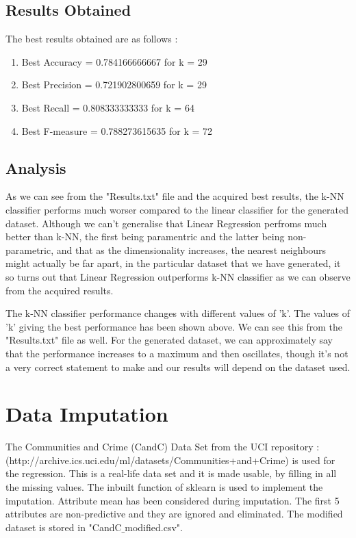 \documentclass[paper=a4, fontsize=11pt]{scrartcl}
\numberwithin{equation}{section}		%
\numberwithin{figure}{section}			%
\numberwithin{table}{section}				%
\begin{document}
\subsection{Results Obtained}
The best results obtained are as follows :
\begin{enumerate}
	\item Best Accuracy = 0.784166666667 for k = 29
	\item Best Precision = 0.721902800659 for k = 29
	\item Best Recall = 0.808333333333 for k = 64
	\item Best F-measure = 0.788273615635 for k = 72
\end{enumerate}

\subsection{Analysis}
As we can see from the "Results.txt" file and the acquired best results, the k-NN classifier performs much worser compared to the linear classifier for the generated dataset. Although we can't generalise that Linear Regression perfroms much better than k-NN, the first being paramentric and the latter being non-parametric, and that as the dimensionality increases, the nearest neighbours might actually be far apart, in the particular dataset that we have generated, it so turns out that Linear Regression  outperforms k-NN classifier as we can observe from the acquired results.

The k-NN classifier performance changes with different values of 'k'. The values of 'k' giving the best performance has been shown above. We can see this from the "Results.txt" file as well. For the generated dataset, we can approximately say that the performance increases to a maximum and then oscillates, though it's not a very correct statement to make and our results will depend on the dataset used.

\section{Data Imputation}
The Communities and Crime (CandC) Data Set from the UCI repository :
\\(http://archive.ics.uci.edu/ml/datasets/Communities+and+Crime) is used for the regression. This is a real-life data set and it is made usable, by filling in all the missing values. The inbuilt function of sklearn is used to implement the imputation. Attribute mean has been considered during imputation. The first 5 attributes are non-predictive and they are ignored and eliminated. The modified dataset is stored in "CandC$\_$modified.csv".
\end{document}
